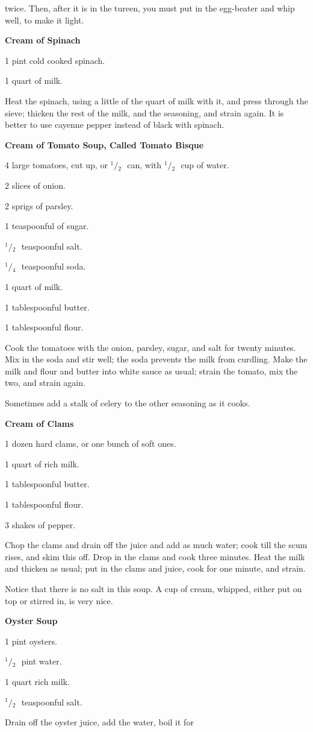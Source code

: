 \documentclass[11pt]{book}
\newcommand{\indpar}{\par\noindent\hspace*{\parindent}}
\newcommand{\ingredient}{\indpar}
\newcommand{\instruction}{\indpar}
\newcommand{\OneHalf}{\ensuremath{{}^1\!\!/\!{}_2\mbox{\ }}}
\newcommand{\OneQuarter}{\ensuremath{{}^1\!\!/\!{}_4\mbox{\ }}}
\newenvironment{RecipeTitle}{\medskip\begin{center}\large\bf }{\end{center}\smallskip}
\begin{document}
twice.  Then, after it is in the tureen, you must put in
the egg-beater and whip well, to make it light.
\begin{RecipeTitle}
Cream of Spinach\label{cream_of_spinach}
\end{RecipeTitle}
\ingredient  1 pint cold cooked spinach.
\ingredient  1 quart of milk.
\instruction
  Heat the spinach, using a little of the quart of milk
with it, and press through the sieve; thicken the rest of
the milk, and the seasoning, and strain again.  It is better
to use cayenne pepper instead of black with spinach.\pagebreak[4]
\begin{RecipeTitle}
Cream of Tomato Soup, Called Tomato Bisque\label{cream_of_tomato_soup}
\end{RecipeTitle}
\ingredient  4 large tomatoes, cut up, or \OneHalf can, with \OneHalf cup of water.
\ingredient  2 slices of onion.
\ingredient  2 sprigs of parsley.
\ingredient  1 teaspoonful of sugar.
\ingredient  \OneHalf teaspoonful salt.
\ingredient  \OneQuarter teaspoonful soda.
\ingredient  1 quart of milk.
\ingredient  1 tablespoonful butter.
\ingredient  1 tablespoonful flour.
\instruction
  Cook the tomatoes with the onion, parsley, sugar, and
salt for twenty minutes.  Mix in the soda and stir well;
the soda prevents the milk from curdling.  Make the milk
and flour and butter into white sauce as usual; strain the
tomato, mix the two, and strain again.
\instruction
  Sometimes add a stalk of celery to the other seasoning
as it cooks.
\begin{RecipeTitle}
Cream of Clams\label{cream_of_clams}
\end{RecipeTitle}
\ingredient  1 dozen hard clams, or one bunch of soft ones.
\ingredient  1 quart of rich milk.
\ingredient  1 tablespoonful butter.
\ingredient  1 tablespoonful flour.
\ingredient  3 shakes of pepper.
\instruction
  Chop the clams and drain off the juice and add as much
water; cook till the scum rises, and skim this off.  Drop
in the clams and cook three minutes.  Heat the milk and
thicken as usual; put in the clams and juice, cook for
one minute, and strain.
\instruction
  Notice that there is no salt in this soup.  A cup of
cream, whipped, either put on top or stirred in, is
very nice.
\begin{RecipeTitle}
Oyster Soup\label{oyster_soup}
\end{RecipeTitle}
\ingredient  1 pint oysters.
\ingredient  \OneHalf pint water.
\ingredient  1 quart rich milk.
\ingredient  \OneHalf teaspoonful salt.
\instruction
  Drain off the oyster juice, add the water, boil it for
\end{document}
